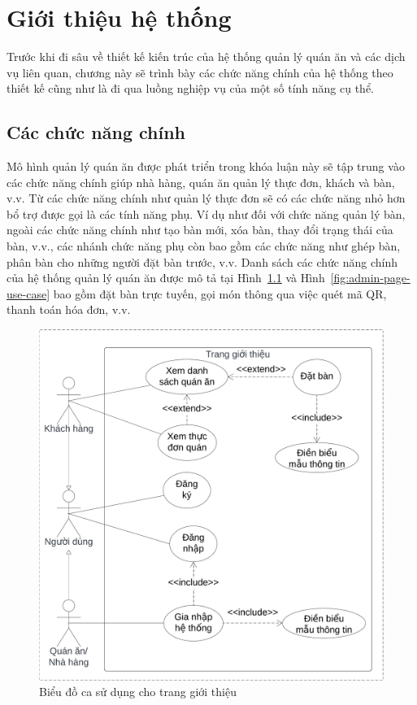\chapter{Giới thiệu hệ thống}\label{chap1}
Trước khi đi sâu về thiết kế kiến trúc của hệ thống quản lý quán ăn và các dịch vụ liên quan, chương này sẽ trình bày các chức năng chính của hệ thống theo thiết kế cũng như là đi qua luồng nghiệp vụ của một số tính năng cụ thể.
\section{Các chức năng chính}\label{sec:main-functions}
Mô hình quản lý quán ăn được phát triển trong khóa luận này sẽ tập trung vào các chức năng chính giúp nhà hàng, quán ăn quản lý thực đơn, khách và bàn, v.v.
Từ các chức năng chính như quản lý thực đơn sẽ có các chức năng nhỏ hơn bổ trợ được gọi là các tính năng phụ.
Ví dụ như đối với chức năng quản lý bàn, ngoài các chức năng chính như tạo bàn mới, xóa bàn, thay đổi trạng thái của bàn, v.v., các nhánh chức năng phụ còn bao gồm các chức năng như ghép bàn, phân bàn cho những người đặt bàn trước, v.v.
Danh sách các chức năng chính của hệ thống quản lý quán ăn được mô tả tại Hình~\ref{fig:landing-page-use-case} và Hình~\ref{fig:admin-page-use-case} bao gồm đặt bàn trực tuyến, gọi món thông qua việc quét mã QR, thanh toán hóa đơn, v.v.

\begin{figure}[H]
	\centering
	\includegraphics[width=\textwidth]{images/hChip/main-flow/landing-page-use-case-diagram.png}
	\caption{Biểu đồ ca sử dụng cho trang giới thiệu }
	\label{fig:landing-page-use-case}
\end{figure}

